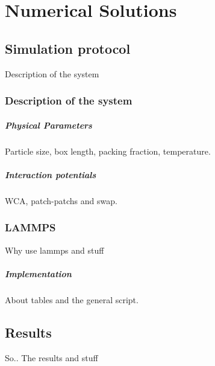 \chapter{Numerical Solutions}

\section{Simulation protocol}

Description of the system

\subsection{Description of the system}

\paragraph{Physical Parameters} Particle size, box length, packing fraction, temperature.

\paragraph{Interaction potentials} WCA, patch-patchs and swap.

\subsection{LAMMPS}

Why use lammps and stuff

\paragraph{Implementation} About tables and the general script.


\section{Results}

So.. The results and stuff

